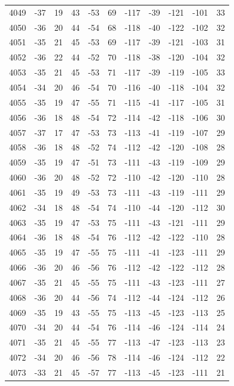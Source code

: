 \begin{table}[H]
\begin{tabular}{lllllllllll}
4049 & -37 & 19 & 43 & -53 & 69 & -117 & -39 & -121 & -101 & 33 \\
4050 & -36 & 20 & 44 & -54 & 68 & -118 & -40 & -122 & -102 & 32 \\
4051 & -35 & 21 & 45 & -53 & 69 & -117 & -39 & -121 & -103 & 31 \\
4052 & -36 & 22 & 44 & -52 & 70 & -118 & -38 & -120 & -104 & 32 \\
4053 & -35 & 21 & 45 & -53 & 71 & -117 & -39 & -119 & -105 & 33 \\
4054 & -34 & 20 & 46 & -54 & 70 & -116 & -40 & -118 & -104 & 32 \\
4055 & -35 & 19 & 47 & -55 & 71 & -115 & -41 & -117 & -105 & 31 \\
4056 & -36 & 18 & 48 & -54 & 72 & -114 & -42 & -118 & -106 & 30 \\
4057 & -37 & 17 & 47 & -53 & 73 & -113 & -41 & -119 & -107 & 29 \\
4058 & -36 & 18 & 48 & -52 & 74 & -112 & -42 & -120 & -108 & 28 \\
4059 & -35 & 19 & 47 & -51 & 73 & -111 & -43 & -119 & -109 & 29 \\
4060 & -36 & 20 & 48 & -52 & 72 & -110 & -42 & -120 & -110 & 28 \\
4061 & -35 & 19 & 49 & -53 & 73 & -111 & -43 & -119 & -111 & 29 \\
4062 & -34 & 18 & 48 & -54 & 74 & -110 & -44 & -120 & -112 & 30 \\
4063 & -35 & 19 & 47 & -53 & 75 & -111 & -43 & -121 & -111 & 29 \\
4064 & -36 & 18 & 48 & -54 & 76 & -112 & -42 & -122 & -110 & 28 \\
4065 & -35 & 19 & 47 & -55 & 75 & -111 & -41 & -123 & -111 & 29 \\
4066 & -36 & 20 & 46 & -56 & 76 & -112 & -42 & -122 & -112 & 28 \\
4067 & -35 & 21 & 45 & -55 & 75 & -111 & -43 & -123 & -111 & 27 \\
4068 & -36 & 20 & 44 & -56 & 74 & -112 & -44 & -124 & -112 & 26 \\
4069 & -35 & 19 & 43 & -55 & 75 & -113 & -45 & -123 & -113 & 25 \\
4070 & -34 & 20 & 44 & -54 & 76 & -114 & -46 & -124 & -114 & 24 \\
4071 & -35 & 21 & 45 & -55 & 77 & -113 & -47 & -123 & -113 & 23 \\
4072 & -34 & 20 & 46 & -56 & 78 & -114 & -46 & -124 & -112 & 22 \\
4073 & -33 & 21 & 45 & -57 & 77 & -113 & -45 & -123 & -111 & 21 \\

\end{tabular}
\end{table}
